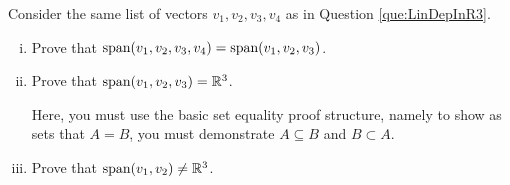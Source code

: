 \begin{question}
    \normalfont


    Consider the same list of vectors $v_1, v_2, v_3, v_4$ \hspace{.1cm} as in Question \ref{que:LinDepInR3}.
    \begin{enumerate}[(i)]
        \item Prove that $\textnormal{span}(v_1, v_2, v_3, v_4) = \textnormal{span}(v_1, v_2, v_3)$.

        \item Prove that $\textnormal{span}(v_1, v_2, v_3) = {\mathbb R}^3$.

              Here, you must use the basic set equality proof structure, namely to show as sets that $A=B$, you must demonstrate $A\subseteq B$ and $B\subset A$.

        \item Prove that $\textnormal{span}(v_1, v_2)\not={\mathbb R}^3$.
    \end{enumerate}
\end{question}

